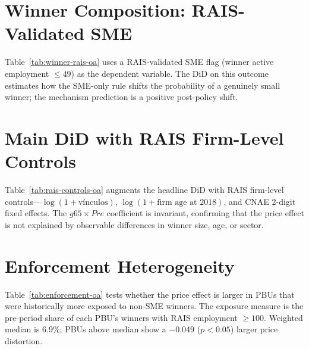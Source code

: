 \documentclass[12pt]{article}
\begin{document}

\section{Winner Composition: RAIS-Validated SME}

Table~\ref{tab:winner-rais-oa} uses a RAIS-validated SME flag (winner active employment $\leq 49$) as the dependent variable. The DiD on this outcome estimates how the SME-only rule shifts the probability of a genuinely small winner; the mechanism prediction is a positive post-policy shift.



\section{Main DiD with RAIS Firm-Level Controls}

Table~\ref{tab:rais-controls-oa} augments the headline DiD with RAIS firm-level controls---$\log(1+\text{v\'inculos})$, $\log(1+\text{firm age at 2018})$, and CNAE 2-digit fixed effects. The $g65 \times Pre$ coefficient is invariant, confirming that the price effect is not explained by observable differences in winner size, age, or sector.


\section{Enforcement Heterogeneity}

Table~\ref{tab:enforcement-oa} tests whether the price effect is larger in PBUs that were historically more exposed to non-SME winners. The exposure measure is the pre-period share of each PBU's winners with RAIS employment $\geq 100$. Weighted median is 6.9\%; PBUs above median show a $-0.049$ ($p<0.05$) larger price distortion.
\end{document}
